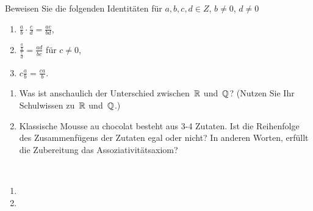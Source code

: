 \begin{aufg}[6 Punkte]
Beweisen Sie die folgenden Identit\"aten f\"ur $a,b,c,d \in
Z$, $b\neq 0$, $d\neq 0$ 
\begin{enumerate}[label=$\mathrm{(\roman*)}$, ref=$\mathrm{\roman*}$]
\item $\frac{a}{b} \cdot \frac{c}{d} = \frac{ac}{bd}$, 
\item $\frac{\frac{a}{b}}{\frac{c}{d}} = \frac{ad}{bc}$ f\"ur $c\not=0$,
\item $c \frac{a}{b} = \frac{ca}{b}$.
\end{enumerate}
\end{aufg}

\bigskip

\begin{lsg}
\end{lsg}

\bigskip


\begin{aufg}[4 Punkte]
\begin{enumerate}[label=$\mathrm{(\roman*)}$, ref=$\mathrm{\roman*}$]
\item Was ist anschaulich der Unterschied zwischen~$\mathbb{R}$ und~$\mathbb{Q}$? (Nutzen Sie Ihr Schulwissen zu~$\mathbb{R}$ und~$\mathbb{Q}$.)
\item Klassische Mousse au chocolat besteht aus 3-4 Zutaten. Ist die Reihenfolge des Zusammenf\"ugens der Zutaten egal oder nicht? In anderen Worten, erf\"ullt die Zubereitung das Assoziativit\"atsaxiom?
\end{enumerate}
\end{aufg}
 
\bigskip

\begin{lsg}\mbox{ }
\begin{enumerate}[label=$\mathrm{(\roman*)}$, ref=$\mathrm{\roman*}$]
\item
%
\item 
\end{enumerate}
\end{lsg}
